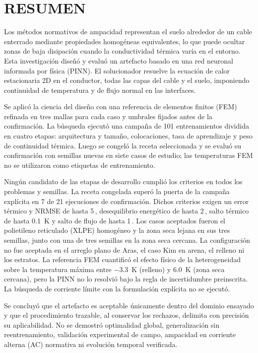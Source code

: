 \chapter*{RESUMEN}

Los métodos normativos de ampacidad representan el suelo alrededor de un cable enterrado mediante propiedades homogéneas equivalentes, lo que puede ocultar zonas de baja disipación cuando la conductividad térmica varía en el entorno. Esta investigación diseñó y evaluó un artefacto basado en una red neuronal informada por física (PINN). El solucionador resuelve la ecuación de calor estacionaria 2D en el conductor, todas las capas del cable y el suelo, imponiendo continuidad de temperatura y de flujo normal en las interfaces.

Se aplicó la ciencia del diseño con una referencia de elementos finitos (FEM) refinada en tres mallas para cada caso y umbrales fijados antes de la confirmación. La búsqueda ejecutó una campaña de 101 entrenamientos dividida en cuatro etapas: arquitectura y tamaño, colocaciones, tasa de aprendizaje y peso de continuidad térmica. Luego se congeló la receta seleccionada y se evaluó su confirmación con semillas nuevas en siete casos de estudio; las temperaturas FEM no se utilizaron como etiquetas de entrenamiento.

Ningún candidato de las etapas de desarrollo cumplió los criterios en todos los problemas y semillas. La receta congelada superó la puerta de la campaña explícita en 7 de 21 ejecuciones de confirmación. Dichos criterios exigen un error térmico y NRMSE de hasta 5\,\pct{}, desequilibrio energético de hasta 2\,\pct{}, salto térmico de hasta \SI{0,1}{\kelvin} y salto de flujo de hasta 1\,\pct{}. Los casos aceptados fueron el polietileno reticulado (XLPE) homogéneo y la zona seca lejana en sus tres semillas, junto con una de tres semillas en la zona seca cercana. La configuración no fue aceptada en el arreglo plano de Aras, el caso Kim en arena, el relleno ni los estratos. La referencia FEM cuantificó el efecto físico de la heterogeneidad sobre la temperatura máxima entre \SI{-3,3}{\kelvin} (relleno) y \SI{+6,0}{\kelvin} (zona seca cercana), pero la PINN no lo resolvió bajo la regla de incertidumbre preinscrita. La búsqueda de corriente límite con la formulación explícita no se ejecutó.

Se concluyó que el artefacto es aceptable únicamente dentro del dominio ensayado y que el procedimiento trazable, al conservar los rechazos, delimita con precisión su aplicabilidad. No se demostró optimalidad global, generalización sin reentrenamiento, validación experimental de campo, ampacidad en corriente alterna (AC) normativa ni evolución temporal verificada.

